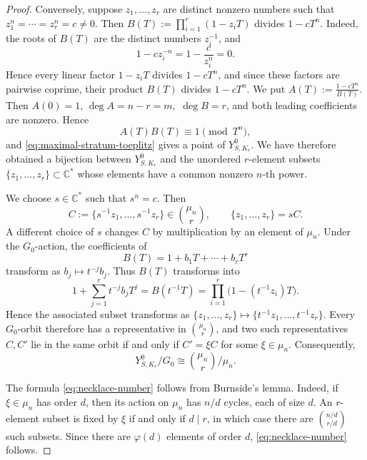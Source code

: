 \documentclass[10pt,a4paper]{amsart}
\begin{document}
\begin{proof}
Conversely, suppose \(z_1,\ldots,z_r\) are distinct nonzero numbers
such that $z_1^n=\cdots=z_r^n=c\neq0.$
Then $B(T):=\prod_{i=1}^r(1-z_iT)$
divides \(1-cT^n\). Indeed, the roots of \(B(T)\) are the distinct numbers \(z_i^{-1}\),
and
\[
1-cz_i^{-n}=1-\frac{c}{z_i^n}=0.
\]
Hence every linear factor \(1-z_iT\) divides \(1-cT^n\), and since
these factors are pairwise coprime, their product \(B(T)\) divides
\(1-cT^n\). We put $A(T):=\frac{1-cT^n}{B(T)}.$
Then \(A(0)=1\), $\deg A=n-r=m,$ $\deg B=r$, and both leading coefficients are nonzero. Hence
\[
A(T)B(T)\equiv1\pmod{T^n},
\]
and \eqref{eq:maximal-stratum-toeplitz} gives a point of
\(Y^0_{S,K_r}\). We have therefore obtained a bijection between
\(Y^0_{S,K_r}\) and the unordered \(r\)-element subsets $\{z_1,\ldots,z_r\}\subset\mathbb C^*$
whose elements have a common nonzero \(n\)-th power.

We choose \(s\in\mathbb C^*\)
such that \(s^n=c\). Then
\[
C:=\{s^{-1}z_1,\ldots,s^{-1}z_r\}
\in\binom{\mu_n}{r},
\qquad
\{z_1,\ldots,z_r\}=sC.
\]
A different choice of \(s\) changes \(C\) by multiplication by an
element of \(\mu_n\). Under the \(G_0\)-action, the coefficients of
\[
B(T)=1+b_1T+\cdots+b_rT^r
\]
transform as \(b_j\mapsto t^{-j}b_j\). Thus \(B(T)\) transforms into
\[
1+\sum_{j=1}^r t^{-j}b_jT^j
=
B(t^{-1}T)
=
\prod_{i=1}^r\bigl(1-(t^{-1}z_i)T\bigr).
\]
Hence the associated subset transforms as $\{z_1,\ldots,z_r\}
\longmapsto
\{t^{-1}z_1,\ldots,t^{-1}z_r\}.$
Every \(G_0\)-orbit therefore has a representative in
\(\binom{\mu_n}{r}\), and two such representatives \(C,C'\) lie in
the same orbit if and only if $C'=\xi C$ for some $\xi\in\mu_n.$
Consequently,
\[
Y^0_{S,K_r}/G_0
\cong
\binom{\mu_n}{r}/\mu_n.
\]



The formula \eqref{eq:necklace-number} follows from Burnside's lemma.
Indeed, if \(\xi\in\mu_n\) has order \(d\), then its action on
\(\mu_n\) has \(n/d\) cycles, each of size \(d\). An \(r\)-element
subset is fixed by \(\xi\) if and only if \(d\mid r\), in which case
there are $\binom{n/d}{r/d}$
such subsets. Since there are \(\varphi(d)\) elements of order \(d\),
\eqref{eq:necklace-number} follows.


\end{proof}
\end{document}
